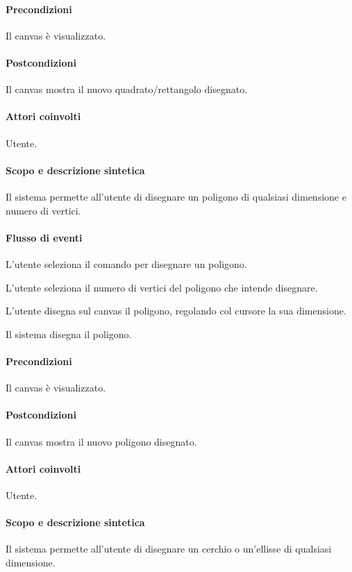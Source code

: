 \paragraph{Precondizioni} Il canvas \`e visualizzato.
\paragraph{Postcondizioni} Il canvas mostra il nuovo quadrato/rettangolo disegnato.

\paragraph{Attori coinvolti} Utente.
\paragraph{Scopo e descrizione sintetica} 
Il sistema permette all'utente di disegnare un poligono di qualsiasi dimensione e numero di vertici.
\paragraph{Flusso di eventi}
\begin{elenconumerato}[\textbf{}]{\subsubsecindent}
\item L'utente seleziona il comando per disegnare un poligono.
\item L'utente seleziona il numero di vertici del poligono che intende disegnare.
\item L'utente disegna sul canvas il poligono, regolando col cursore la sua dimensione.
\item Il sistema disegna il poligono.
\end{elenconumerato}
\paragraph{Precondizioni} Il canvas \`e visualizzato.
\paragraph{Postcondizioni} Il canvas mostra il nuovo poligono disegnato.

\paragraph{Attori coinvolti} Utente.
\paragraph{Scopo e descrizione sintetica} 
Il sistema permette all'utente di disegnare un cerchio o un'ellisse di qualsiasi dimensione.
